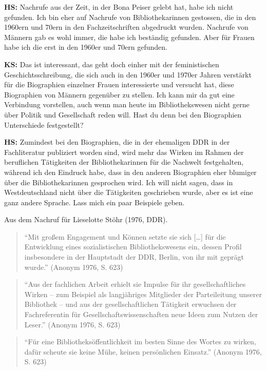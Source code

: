 \documentclass[a4paper,
fontsize=11pt,
oneside,
numbers=noperiodatend,
parskip=half-,
bibliography=totoc,
final
]{scrartcl}
\begin{document}
\textbf{HS:} Nachrufe aus der Zeit, in der Bona Peiser gelebt hat, habe
ich nicht gefunden. Ich bin eher auf Nachrufe von Bibliothekarinnen
gestossen, die in den 1960ern und 70ern in den Fachzeitschriften
abgedruckt wurden. Nachrufe von Männern gab es wohl immer, die habe ich
beständig gefunden. Aber für Frauen habe ich die erst in den 1960er und
70ern gefunden.

\textbf{KS:} Das ist interessant, das geht doch einher mit der
feministischen Geschichtsschreibung, die sich auch in den 1960er und
1970er Jahren verstärkt für die Biographien einzelner Frauen
interessierte und versucht hat, diese Biographien von Männern gegenüber
zu stellen. Ich kann mir da gut eine Verbindung vorstellen, auch wenn
man heute im Bibliothekswesen nicht gerne über Politik und Gesellschaft
reden will. Hast du denn bei den Biographien Unterschiede festgestellt?

\textbf{HS:} Zumindest bei den Biographien, die in der ehemaligen DDR in
der Fachliteratur publiziert worden sind, wird mehr das Wirken im Rahmen
der beruflichen Tätigkeiten der Bibliothekarinnen für die Nachwelt
festgehalten, während ich den Eindruck habe, dass in den anderen
Biographien eher blumiger über die Bibliothekarinnen gesprochen wird.
Ich will nicht sagen, dass in Westdeutschland nicht über die Tätigkeiten
geschrieben wurde, aber es ist eine ganz andere Sprache. Lass mich ein
paar Beispiele geben.

Aus dem Nachruf für Lieselotte Stöhr (1976, DDR).

\begin{quote}
\enquote{Mit großem Engagement und Können setzte sie sich {[}\ldots{}{]}
für die Entwicklung eines sozialistischen Bibliothekswesens ein, dessen
Profil insbesondere in der Hauptstadt der DDR, Berlin, von ihr mit
geprägt wurde.} (Anonym 1976, S. 623)
\end{quote}

\begin{quote}
\enquote{Aus der fachlichen Arbeit erhielt sie Impulse für ihr
gesellschaftliches Wirken -- zum Beispiel als langjähriges Mitglieder
der Parteileitung unserer Bibliothek -- und aus der gesellschaftlichen
Tätigkeit erwuchsen der Fachreferentin für Gesellschaftswissenschaften
neue Ideen zum Nutzen der Leser.} (Anonym 1976, S. 623)
\end{quote}

\begin{quote}
\enquote{Für eine Bibliotheksöffentlichkeit im besten Sinne des Wortes
zu wirken, dafür scheute sie keine Mühe, keinen persönlichen Einsatz.}
(Anonym 1976, S. 623)
\end{quote}
\end{document}
